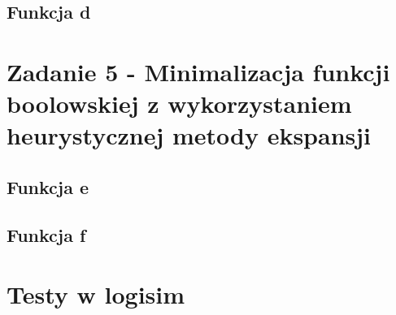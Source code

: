 \documentclass[a4paper, 12pt]{article}
\begin{document}
    \newpage
    \subsection{Funkcja d}\label{subsec:fun-d}
    

    \newpage
    \section{Zadanie 5 - Minimalizacja funkcji boolowskiej z wykorzystaniem heurystycznej metody ekspansji}\label{sec:task-4}
    \subsection{Funkcja e}\label{subsec:fun-e}
    

    \newpage
    \subsection{Funkcja f}\label{subsec:fun-f}
    

    \newpage
    \section{Testy w logisim}\label{sec:test}
    
\end{document}
